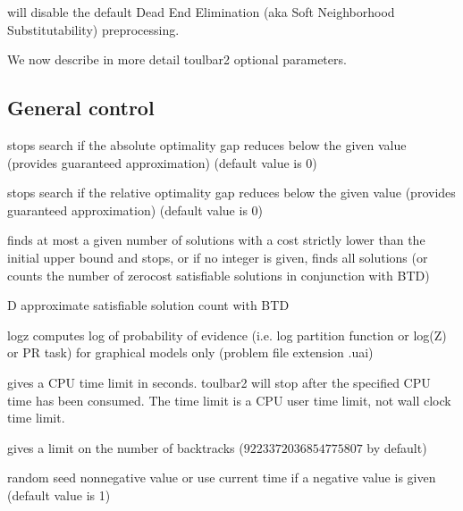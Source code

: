 \documentclass[letterpaper,10pt,openany,oneside,english]{sphinxmanual}
\begin{document}
\sphinxAtStartPar
will disable the default Dead End Elimination  (aka Soft
Neighborhood Substitutability) preprocessing.

\sphinxAtStartPar
We now describe in more detail toulbar2 optional parameters.


\subsection{General control}
\label{\detokenize{userdoc:general-control}}\begin{description}
\sphinxAtStartPar
stops search if the absolute optimality gap reduces below the given value (provides guaranteed approximation) (default value is 0)

\sphinxAtStartPar
stops search if the relative optimality gap reduces below the given value (provides guaranteed approximation) (default value is 0)

\sphinxAtStartPar
finds at most a given number of solutions with a cost strictly lower than the initial upper bound and stops, or if no integer is given, finds all solutions (or counts the number of zero\sphinxhyphen{}cost satisfiable solutions in conjunction with BTD)

\end{description}
\begin{optionlist}{3cm}
\item [\sphinxhyphen{}D]  
\sphinxAtStartPar
approximate satisfiable solution count with BTD
\item [\sphinxhyphen{}logz]  
\sphinxAtStartPar
computes log of probability of evidence (i.e. log partition function or log(Z) or PR task) for graphical models only (problem file extension .uai)
\end{optionlist}
\begin{description}
\sphinxAtStartPar
gives a CPU time limit in seconds. toulbar2 will stop after the specified CPU time has been consumed. The time limit is a CPU user time limit, not wall clock time limit.

\sphinxAtStartPar
gives a limit on the number of backtracks (\(9223372036854775807\) by default)

\sphinxAtStartPar
random seed non\sphinxhyphen{}negative value or use current time if a negative value is given (default value is 1)

\end{description}
\end{document}
